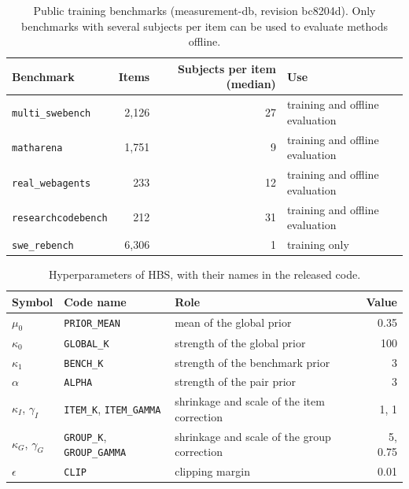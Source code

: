 \documentclass{article}
\newcommand{\bench}[1]{\texttt{#1}}
\begin{document}
\begin{table}[ht]
  \caption{Public training benchmarks (measurement-db, revision bc8204d). Only benchmarks with several subjects per item can be used to evaluate methods offline.}
  \label{tab:data}
  \centering
  \small
  \begin{tabular}{lrrl}
    \toprule
    Benchmark & Items & Subjects per item (median) & Use \\
    \midrule
    \bench{multi\_swebench}    & 2,126 & 27 & training and offline evaluation \\
    \bench{matharena}          & 1,751 &  9 & training and offline evaluation \\
    \bench{real\_webagents}    &   233 & 12 & training and offline evaluation \\
    \bench{researchcodebench}  &   212 & 31 & training and offline evaluation \\
    \bench{swe\_rebench}       & 6,306 &  1 & training only \\
    \bottomrule
  \end{tabular}
\end{table}

\begin{table}[ht]
  \caption{Hyperparameters of HBS, with their names in the released code.}
  \label{tab:hparams}
  \centering
  \small
  \begin{tabular}{lllr}
    \toprule
    Symbol & Code name & Role & Value \\
    \midrule
    $\mu_0$ & \texttt{PRIOR\_MEAN} & mean of the global prior & 0.35 \\
    $\kappa_0$ & \texttt{GLOBAL\_K} & strength of the global prior & 100 \\
    $\kappa_1$ & \texttt{BENCH\_K} & strength of the benchmark prior & 3 \\
    $\alpha$ & \texttt{ALPHA} & strength of the pair prior & 3 \\
    $\kappa_I$, $\gamma_I$ & \texttt{ITEM\_K}, \texttt{ITEM\_GAMMA} & shrinkage and scale of the item correction & 1, 1 \\
    $\kappa_G$, $\gamma_G$ & \texttt{GROUP\_K}, \texttt{GROUP\_GAMMA} & shrinkage and scale of the group correction & 5, 0.75 \\
    $\epsilon$ & \texttt{CLIP} & clipping margin & 0.01 \\
    \bottomrule
  \end{tabular}
\end{table}
\end{document}
